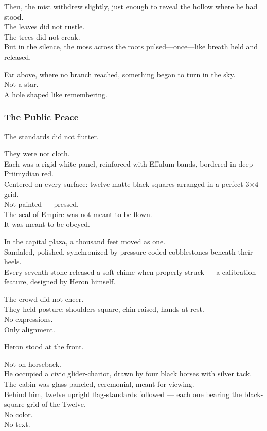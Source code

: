 \documentclass[12pt]{article}
\begin{document}
Then, the mist withdrew slightly, just enough to reveal the hollow where he had stood.\\
The leaves did not rustle.\\
The trees did not creak.\\
But in the silence, the moss across the roots pulsed—once—like breath held and released.

\vspace{1em}

Far above, where no branch reached, something began to turn in the sky.\\
Not a star.\\
A hole shaped like remembering.

\dotfill

\subsubsection{The Public Peace}

The standards did not flutter.

They were not cloth.\\
Each was a rigid white panel, reinforced with Effulum bands, bordered in deep Priimydian red.\\
Centered on every surface: twelve matte-black squares arranged in a perfect 3×4 grid.\\
Not painted — pressed.\\
The seal of Empire was not meant to be flown.\\
It was meant to be obeyed.

\vspace{1em}

In the capital plaza, a thousand feet moved as one.\\
Sandaled, polished, synchronized by pressure-coded cobblestones beneath their heels.\\
Every seventh stone released a soft chime when properly struck — a calibration feature, designed by Heron himself.

The crowd did not cheer.\\
They held posture: shoulders square, chin raised, hands at rest.\\
No expressions.\\
Only alignment.

Heron stood at the front.

Not on horseback.\\
He occupied a civic glider-chariot, drawn by four black horses with silver tack.\\
The cabin was glass-paneled, ceremonial, meant for viewing.\\
Behind him, twelve upright flag-standards followed — each one bearing the black-square grid of the Twelve.\\
No color.\\
No text.
\end{document}

